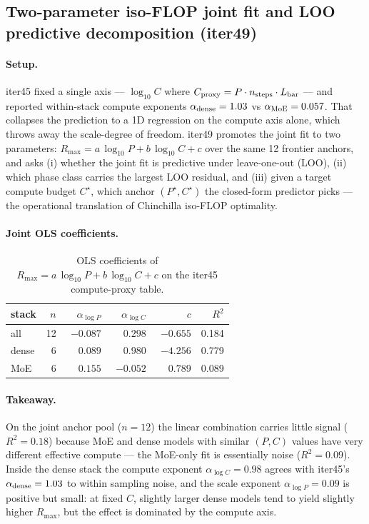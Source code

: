 \documentclass{article}
\begin{document}
 \subsection{Two-parameter iso-FLOP joint fit and LOO predictive decomposition (iter49)}
\label{sec:scaling-law-iter49}
\paragraph{Setup.}
iter45 fixed a single axis --- $\log_{10}C$ where $C_{\rm proxy}=P\cdot n_{\rm steps}\cdot L_{\rm bar}$ --- and reported within-stack compute exponents $\alpha_{\rm dense}=1.03$ vs $\alpha_{\rm MoE}=0.057$. That collapses the prediction to a 1D regression on the compute axis alone, which throws away the scale-degree of freedom. iter49 promotes the joint fit to two parameters: $R_{\max}=a\,\log_{10}P + b\,\log_{10}C + c$ over the same 12 frontier anchors, and asks (i) whether the joint fit is predictive under leave-one-out (LOO), (ii) which phase class carries the largest LOO residual, and (iii) given a target compute budget $C^{\star}$, which anchor $(P^{\star}, C^{\star})$ the closed-form predictor picks --- the operational translation of Chinchilla iso-FLOP optimality.

\paragraph{Joint OLS coefficients.}
\begin{table}[ht]
\centering\small
\begin{tabular}{lrrrrr}
\toprule
stack & $n$ & $\alpha_{\log P}$ & $\alpha_{\log C}$ & $c$ & $R^2$ \\
\midrule
 all   & 12 & $-0.087$ & $\phantom{-}0.298$ & $-0.655$ & 0.184 \\
 dense &  6 & $\phantom{-}0.089$ & $\phantom{-}0.980$ & $-4.256$ & 0.779 \\
 MoE   &  6 & $\phantom{-}0.155$ & $-0.052$ & $\phantom{-}0.789$ & 0.089 \\
\bottomrule
\end{tabular}
\caption{OLS coefficients of $R_{\max}=a\,\log_{10}P + b\,\log_{10}C + c$ on the iter45 compute-proxy table.}
\end{table}

\paragraph{Takeaway.}
On the joint anchor pool ($n=12$) the linear combination carries little signal ($R^2=0.18$) because MoE and dense models with similar $(P, C)$ values have very different effective compute --- the MoE-only fit is essentially noise ($R^2=0.09$). Inside the dense stack the compute exponent $\alpha_{\log C}=0.98$ agrees with iter45's $\alpha_{\rm dense}=1.03$ to within sampling noise, and the scale exponent $\alpha_{\log P}=0.09$ is positive but small: at fixed $C$, slightly larger dense models tend to yield slightly higher $R_{\max}$, but the effect is dominated by the compute axis.
\end{document}
